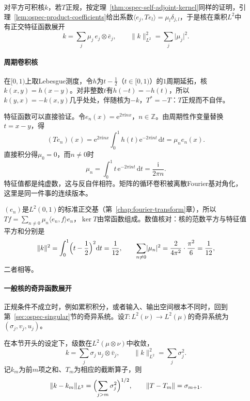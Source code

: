 对平方可积核$k$，若$T$正规，按定理~\ref{thm:ospec-self-adjoint-kernel}同样的证明，引理~\ref{lem:ospec-product-coefficients}给出系数$\langle e_j,Te_l\rangle=\mu_l\delta_{j,l}$，于是核在乘积$L^2$中有正交特征函数展开
\begin{equation}
k=\sum_j\mu_j\,e_j\otimes\bar e_j,\qquad\lVert k\rVert_{L^2}^2=\sum_j\lvert\mu_j\rvert^2 .
\label{eq:ospec-normal-kernel}
\end{equation}

\paragraph{周期卷积核}
在$[0,1)$上取Lebesgue测度，令$h$为$t-\frac12$（$t\in[0,1)$）的$1$周期延拓，核$k(x,y)=h(x-y)$。对非整数$t$有$h(-t)=-h(t)$，所以$k(y,x)=-k(x,y)$几乎处处，伴随核为$-k$，$T^*=-T$：$T$正规而不自伴。

特征函数可以直接验证。令$e_n(x)=\mathrm e^{2\pi\mathrm inx}$，$n\in\mathbb Z$。由周期性作变量替换$t=x-y$，得
\[
(Te_n)(x)=\mathrm e^{2\pi\mathrm inx}\int_0^1h(t)\mathrm e^{-2\pi\mathrm int}\,\mathrm dt=\mu_ne_n(x).
\]
直接积分得$\mu_0=0$，而$n\neq0$时
\[
\mu_n=\int_0^1t\,\mathrm e^{-2\pi\mathrm int}\,\mathrm dt=\frac{\mathrm i}{2\pi n}.
\]
特征值都是纯虚数，这与反自伴相符。矩阵的循环卷积被离散Fourier基对角化，这里是同一件事的连续版本。

$(e_n)$是$L^2(0,1)$的标准正交基（第~\ref{chap:fourier-transform}章），所以$Tf=\sum_{n\neq0}\mu_n\langle e_n,f\rangle e_n$，$\ker T$由常函数组成。数值核对：核的范数平方与特征值平方和分别是
\[
\lVert k\rVert^2=\int_0^1\Bigl(t-\frac12\Bigr)^2\mathrm dt=\frac1{12},\qquad
\sum_{n\neq0}\lvert\mu_n\rvert^2=\frac{2}{4\pi^2}\cdot\frac{\pi^2}{6}=\frac1{12},
\]
二者相等。

\paragraph{一般核的奇异函数展开}
正规条件不成立时，例如累积积分，或者输入、输出空间根本不同时，回到第~\ref{sec:ospec-singular}节的奇异系统。设$T:L^2(\nu)\to L^2(\mu)$的奇异系统为$(\sigma_j,v_j,u_j)$。

\begin{theorem}[平方可积核的奇异函数展开]
\label{thm:ospec-kernel-svd}
在本节开头的设定下，级数在$L^2(\mu\otimes\nu)$中收敛，
\begin{equation}
k=\sum_j\sigma_j\,u_j\otimes\bar v_j,\qquad\lVert k\rVert_{L^2}^2=\sum_j\sigma_j^2 .
\label{eq:ospec-kernel-svd}
\end{equation}
记$k_m$为前$m$项之和、$T_m$为相应的截断算子，则
\begin{equation}
\lVert k-k_m\rVert_{L^2}=\Bigl(\sum_{j>m}\sigma_j^2\Bigr)^{1/2},\qquad\lVert T-T_m\rVert=\sigma_{m+1} .
\label{eq:ospec-kernel-svd-error}
\end{equation}
\end{theorem}

